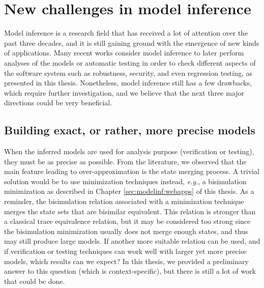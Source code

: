 \section{New challenges in model inference}
\label{sec:conclusion:modelinf}

Model inference is a research field that has received a lot of
attention over the past three decades, and it is still gaining
ground with the emergence of new kinds of applications. Many
recent works consider model inference to later perform analyses
of the models or automatic testing in order to check different
aspects of the software system such as robustness, security, and
even regression testing, as presented in this thesis.
Nonetheless, model inference still has a few drawbacks, which
require further investigation, and we believe that the next three
major directions could be very beneficial.

\subsection{Building exact, or rather, more precise models}
\label{sec:conclusion:modelinf:exact}

When the inferred models are used for analysis purpose
(verification or testing), they must be as precise as possible.
From the literature, we observed that the main feature leading to
over-approximation is the state merging process. A trivial
solution would be to use minimization techniques instead,
\emph{e.g.}, a bisimulation minimization as described in Chapter
\ref{sec:modelinf:webapps} of this thesis.  As a reminder, the
bisimulation relation associated with a minimization technique
merges the state sets that are bisimilar equivalent. This
relation is stronger than a classical trace equivalence relation,
but it may be considered too strong since the bisimulation
minimization usually does not merge enough states, and thus may
still produce large models. If another more suitable relation can
be used, and if verification or testing techniques can work well
with larger yet more precise models, which results can we expect?
In this thesis, we provided a preliminary answer to this question
(which is context-specific), but there is still a lot of work
that could be done.

